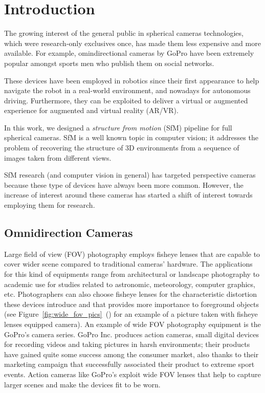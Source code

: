 \chapter{Introduction}
The growing interest of the general public in spherical cameras technologies, which were 
research-only exclusives once, has made them less expensive and more available. For example, omindirectional cameras by GoPro have been extremely popular amongst sports men who publish them on social networks.

These devices have been employed in robotics since their first appearance to help navigate the robot in a real-world environment, and nowadays for autonomous driving. Furthermore, they can be exploited to deliver a virtual or augmented experience for augmented and virtual reality (AR/VR).

In this work, we designed a \textit{structure from motion} (SfM) pipeline for 
full spherical cameras. SfM is a well known topic in computer vision; it addresses the problem of 
recovering the structure of 3D environments from a sequence of images taken from different views.

SfM research (and computer vision in general) has targeted perspective cameras because these type of devices have always been more common. However, the increase of interest around these cameras has started a shift of interest towards employing them for research.

\section{Omnidirection Cameras}
Large field of view (FOV) photography employs fisheye lenses that are capable to cover 
wider scene compared to traditional cameras' hardware.
The applications for this kind of equipments range from architectural or 
landscape photography to academic use for studies related to astronomic, 
meteorology, computer graphics, etc.
Photographers can also choose fisheye lenses for the characteristic distortion
these devices introduce and that provides more importance to foreground objects
(see Figure~\ref{fig:wide_fov_pics}~() for an 
example of a picture taken with fisheye lenses equipped camera).
An example of wide FOV photography equipment is the GoPro\registered's camera series.
GoPro Inc\registered. produces action cameras, small digital devices for recording videos 
and taking pictures in harsh environments; their products have gained quite 
some success among the consumer market, also thanks to their marketing campaign 
that successfully associated their product to extreme sport events.
Action cameras like GoPro\registered's exploit wide FOV lenses that help to capture larger
scenes and make the devices fit to be worn.

